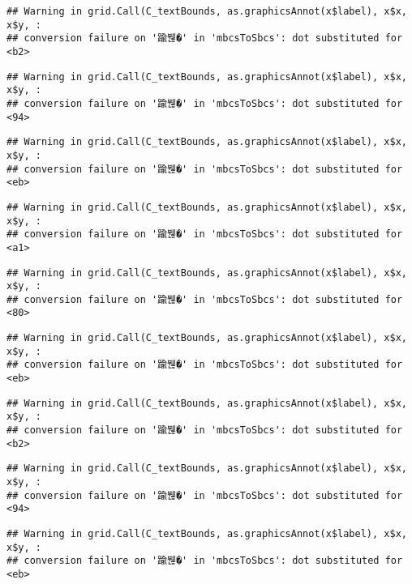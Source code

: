\documentclass[
]{article}
\begin{document}
\begin{verbatim}
## Warning in grid.Call(C_textBounds, as.graphicsAnnot(x$label), x$x, x$y, :
## conversion failure on '踰붾�' in 'mbcsToSbcs': dot substituted for <b2>
\end{verbatim}

\begin{verbatim}
## Warning in grid.Call(C_textBounds, as.graphicsAnnot(x$label), x$x, x$y, :
## conversion failure on '踰붾�' in 'mbcsToSbcs': dot substituted for <94>
\end{verbatim}

\begin{verbatim}
## Warning in grid.Call(C_textBounds, as.graphicsAnnot(x$label), x$x, x$y, :
## conversion failure on '踰붾�' in 'mbcsToSbcs': dot substituted for <eb>
\end{verbatim}

\begin{verbatim}
## Warning in grid.Call(C_textBounds, as.graphicsAnnot(x$label), x$x, x$y, :
## conversion failure on '踰붾�' in 'mbcsToSbcs': dot substituted for <a1>
\end{verbatim}

\begin{verbatim}
## Warning in grid.Call(C_textBounds, as.graphicsAnnot(x$label), x$x, x$y, :
## conversion failure on '踰붾�' in 'mbcsToSbcs': dot substituted for <80>
\end{verbatim}

\begin{verbatim}
## Warning in grid.Call(C_textBounds, as.graphicsAnnot(x$label), x$x, x$y, :
## conversion failure on '踰붾�' in 'mbcsToSbcs': dot substituted for <eb>
\end{verbatim}

\begin{verbatim}
## Warning in grid.Call(C_textBounds, as.graphicsAnnot(x$label), x$x, x$y, :
## conversion failure on '踰붾�' in 'mbcsToSbcs': dot substituted for <b2>
\end{verbatim}

\begin{verbatim}
## Warning in grid.Call(C_textBounds, as.graphicsAnnot(x$label), x$x, x$y, :
## conversion failure on '踰붾�' in 'mbcsToSbcs': dot substituted for <94>
\end{verbatim}

\begin{verbatim}
## Warning in grid.Call(C_textBounds, as.graphicsAnnot(x$label), x$x, x$y, :
## conversion failure on '踰붾�' in 'mbcsToSbcs': dot substituted for <eb>
\end{verbatim}
\end{document}
